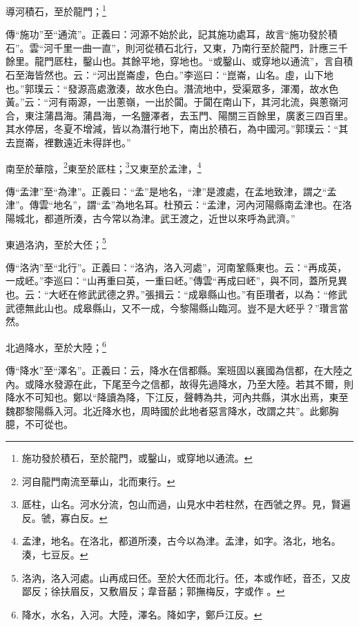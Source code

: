 導河積石，至於龍門；\footnote{施功發於積石，至於龍門，或鑿山，或穿地以通流。}

{\noindent\zhuan{}\fzbyks 傳“施功”至“通流”。正義曰：河源不始於此，記其施功處耳，故言“施功發於積石”。雲“河千里一曲一直”，則河從積石北行，又東，乃南行至於龍門，計應三千餘里。龍門厎柱，鑿山也。其餘平地，穿地也。“或鑿山、或穿地以通流”，言自積石至海皆然也。云：“河出崑崙虛，色白。”李巡曰：“崑崙，山名。虛，山下地也。”郭璞云：“發源高處激湊，故水色白。潛流地中，受渠眾多，渾濁，故水色黃。”云：“河有兩源，一出蔥嶺，一出於闐。于闐在南山下，其河北流，與蔥嶺河合，東注蒲昌海。蒲昌海，一名鹽澤者，去玉門、陽關三百餘里，廣袤三四百里。其水停居，冬夏不增減，皆以為潛行地下，南出於積石，為中國河。”郭璞云：“其去崑崙，裡數遠近未得詳也。” \par}

南至於華陰，\footnote{河自龍門南流至華山，北而東行。}東至於厎柱；\footnote{厎柱，山名。河水分流，包山而過，山見水中若柱然，在西虢之界。見，賢遍反。虢，寡白反。}又東至於孟津，\footnote{孟津，地名。在洛北，都道所湊，古今以為津。孟津，如字。洛北，地名。湊，七豆反。}

{\noindent\zhuan{}\fzbyks 傳“孟津”至“為津”。正義曰：“孟”是地名，“津”是渡處，在孟地致津，謂之“孟津”。傳雲“地名”，謂“孟”為地名耳。杜預云：“孟津，河內河陽縣南孟津也。在洛陽城北，都道所湊，古今常以為津。武王渡之，近世以來呼為武濟。” \par}

東過洛汭，至於大伾；\footnote{洛汭，洛入河處。山再成曰伾。至於大伾而北行。伾，本或作岯，音丕，又皮鄙反；徐扶眉反，又敷眉反；韋音嚭；郭撫梅反，字或作 。}

{\noindent\zhuan{}\fzbyks 傳“洛汭”至“北行”。正義曰：“洛汭，洛入河處”，河南鞏縣東也。云：“再成英，一成岯。”李巡曰：“山再重曰英，一重曰岯。”傳雲“再成曰岯”，與不同，蓋所見異也。云：“大岯在修武武德之界。”張揖云：“成皋縣山也。”有臣瓚者，以為：“修武武德無此山也。成皋縣山，又不一成，今黎陽縣山臨河。豈不是大岯乎？”瓚言當然。 \par}

北過降水，至於大陸；\footnote{降水，水名，入河。大陸，澤名。降如字，鄭戶江反。}

{\noindent\zhuan{}\fzbyks 傳“降水”至“澤名”。正義曰：云，降水在信都縣。案班固以襄國為信都，在大陸之內。或降水發源在此，下尾至今之信都，故得先過降水，乃至大陸。若其不爾，則降水不可知也。鄭以“降讀為降，下江反，聲轉為共，河內共縣，淇水出焉，東至魏郡黎陽縣入河。北近降水也，周時國於此地者惡言降水，改謂之共”。此鄭胸臆，不可從也。\par}

